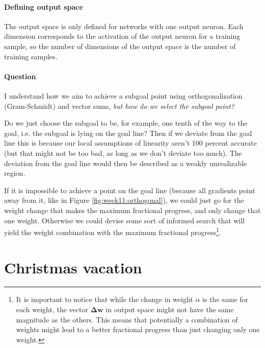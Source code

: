 \documentclass{article}
\renewcommand\vec{\mathbf}
\begin{document}
\paragraph{Defining output space}
The output space is only defined for networks with one output neuron. Each dimension corresponds to the activation of the output neuron for a training sample, so the number of dimensions of the output space is the number of training samples.

\paragraph{Question}
I understand how we aim to achieve a subgoal point using orthogonalization (Gram-Schmidt) and vector sums, \textit{but how do we select the subgoal point?}

Do we just choose the subgoal to be, for example, one tenth of the way to the goal, i.e. the subgoal is lying on the goal line?
Then if we deviate from the goal line this is because our local assumptions of linearity aren't 100 percent accurate (but that might not be too bad, as long as we don't deviate too much).
The deviation from the goal line would then be described as a weakly unrealizable region.

If it is impossible to achieve a point on the goal line (because all gradients point away from it, like in Figure \ref{fig:week11:orthogonal}), we could just go for the weight change that makes the maximum fractional progress, and only change that one weight. 
Otherwise we could devise some sort of informed search that will yield the weight combination with the maximum fractional progress\footnote{It is important to notice that while the change in weight $\alpha$ is the same for each weight, the vector $\vec{\Delta w}$ in output space might not have the same magnitude as the others. This means that potentially a combination of weights might lead to a better fractional progress than just changing only one weight.}. 




\section{Christmas vacation}
\end{document}
